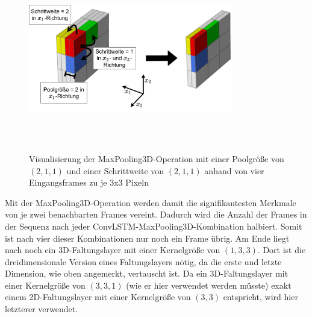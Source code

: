 \begin{figure}[ht!]
    \centering
    \includegraphics[width=0.8\textwidth,height=8cm,keepaspectratio=true]{content/images/MaxPooling3D.jpeg}
    \caption{Visualisierung der MaxPooling3D-Operation mit einer Poolgröße von $(2, 1, 1)$ und einer Schrittweite von $(2, 1, 1)$ anhand von vier Eingangsframes zu je 3x3 Pixeln}
    \label{fig:MaxPooling3D}
\end{figure}

Mit der MaxPooling3D-Operation werden damit die signifikantesten Merkmale von je zwei benachbarten Frames vereint.
Dadurch wird die Anzahl der Frames in der Sequenz nach jeder ConvLSTM-MaxPooling3D-Kombination halbiert.
Somit ist nach vier dieser Kombinationen nur noch ein Frame übrig.
Am Ende liegt nach \cite{CrimeConvLSTM} noch ein 3D-Faltungslayer mit einer Kernelgröße von $(1, 3, 3)$.
Dort ist die dreidimensionale Version eines Faltungslayers nötig, da die erste und letzte Dimension, wie oben angemerkt, vertauscht ist.
Da ein 3D-Faltungslayer mit einer Kernelgröße von $(3, 3, 1)$ (wie er hier verwendet werden müsste) exakt einem 2D-Faltungslayer mit einer Kernelgröße von $(3, 3)$ entspricht, wird hier letzterer verwendet.

